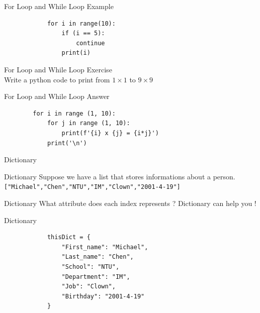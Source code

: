 \documentclass{beamer}
\begin{document}
    \begin{frame}[fragile]{For Loop and While Loop}
        \color{blue} \Large Example \\
        \color{black} \normalsize \vskip 5pt
        \begin{verbatim}
            for i in range(10):
                if (i == 5):
                    continue
                print(i)
        \end{verbatim}
    \end{frame}
    
    \begin{frame}{For Loop and While Loop}
        \color{blue} \Large Exercise \\
        \color{black} \normalsize \vskip 5pt
        Write a python code to print from $1 \times 1$ to $9 \times 9$
    \end{frame}
    
    \begin{frame}[fragile]{For Loop and While Loop}
        \color{blue} \Large Answer \\
        \color{black} \normalsize \vskip 5pt
        \begin{verbatim}
        for i in range (1, 10):
            for j in range (1, 10):
                print(f'{i} x {j} = {i*j}')
            print('\n')
        \end{verbatim}
    \end{frame}

    \begin{frame}
        \begin{center}
            \color{blue} \LARGE Dictionary
        \end{center}
    \end{frame}

    \begin{frame}{Dictionary}
        Suppose we have a list that stores informations about a person. \\
        \texttt{["Michael","Chen","NTU","IM","Clown","2001-4-19"]}
    \end{frame}

    \begin{frame}{Dictionary}
        What attribute does each index represents ?
        \vskip 20pt 
        Dictionary can help you !
    \end{frame}

    \begin{frame}[fragile]{Dictionary}
        \begin{verbatim}
            thisDict = {
                "First_name": "Michael",
                "Last_name": "Chen",
                "School": "NTU",
                "Department": "IM",
                "Job": "Clown",
                "Birthday": "2001-4-19"
            }
        \end{verbatim}
    \end{frame}
    
\end{document}
